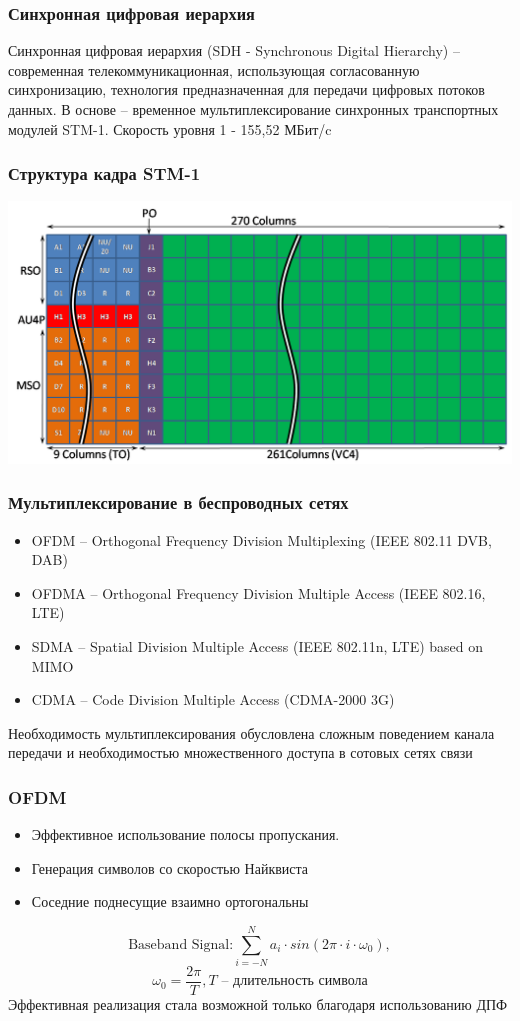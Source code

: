 \documentclass[utf8]{beamer}
\begin{document}
\begin{frame}
\frametitle{Синхронная цифровая иерархия}
Синхронная цифровая иерархия (SDH - Synchronous Digital Hierarchy) – современная телекоммуникационная, использующая согласованную синхронизацию, технология предназначенная для передачи цифровых потоков данных. В основе – временное мультиплексирование синхронных транспортных модулей STM-1. Скорость уровня 1 - 155,52 МБит/c
\end{frame}
\begin{frame}
\frametitle{Структура кадра STM-1}
\includegraphics[width=\textwidth]{pic/stm-1.png}
\end{frame}
\begin{frame}
\frametitle{Мультиплексирование в беспроводных сетях}
\begin{itemize}
	\item OFDM -- Orthogonal Frequency Division Multiplexing (IEEE 802.11 DVB, DAB)
	\item OFDMA -- Orthogonal Frequency Division Multiple Access (IEEE 802.16, LTE)
	\item SDMA -- Spatial Division Multiple Access (IEEE 802.11n, LTE) based on MIMO
	\item CDMA -- Code Division Multiple Access (CDMA-2000 3G)
\end{itemize}
Необходимость мультиплексирования обусловлена сложным поведением канала передачи и необходимостью множественного доступа в сотовых сетях связи
\end{frame}
\begin{frame}
\frametitle{OFDM}
\begin{itemize}
	\item Эффективное использование полосы пропускания.
	\item Генерация символов со скоростью Найквиста
	\item Соседние поднесущие взаимно ортогональны
\end{itemize}
$$
\textrm{Baseband Signal:} 
\sum_{i=-N}^{N}a_i \cdot sin(2\pi \cdot i \cdot \omega_0),
$$
$$
\omega_0 = \frac{2 \pi}{ T}, T \textrm{ -- длительность символа}
$$
Эффективная реализация стала возможной только благодаря использованию ДПФ
\end{frame}
\end{document}
